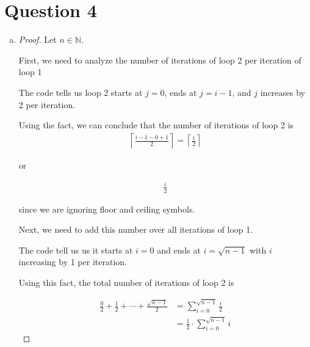 \documentclass[12pt]{article}
\begin{document}
\section*{Question 4}
\begin{enumerate}[a.]
    \item

    \begin{proof}
        Let $n \in \mathbb{N}$.

        \bigskip

        First, we need to analyze the number of iterations of loop 2 per iteration of
        loop 1

        \bigskip

        The code tells us loop 2 starts at $j = 0$, ends at $j = i-1$, and $j$ increases
        by 2 per iteration.

        \bigskip

        Using the fact, we can conclude that the number of iterations of loop 2 is
        \setcounter{equation}{0}
        \begin{align}
            \left\lceil \frac{i-1-0+1}{2} \right\rceil = \left\lceil \frac{i}{2} \right\rceil
        \end{align}

        or

        \begin{align}
            \frac{i}{2}
        \end{align}

        since we are ignoring floor and ceiling symbols.

        \bigskip

        Next, we need to add this number over all iterations of loop 1.

        \bigskip

        The code tell us us it starts at $i = 0$ and ends at $i = \sqrt{n-1}$ with $i$
        increasing by 1 per iteration.

        \bigskip

        Using this fact, the total number of iterations of loop 2 is

        \begin{align}
            \frac{0}{2} + \frac{1}{2} + \cdots + \frac{\sqrt{n-1}}{2} &= \sum\limits_{i=0}^{\sqrt{n-1}} \frac{i}{2}\\
            &= \frac{1}{2} \cdot \sum\limits_{i=0}^{\sqrt{n-1}} i
        \end{align}


\end{proof}
\end{enumerate}
\end{document}
